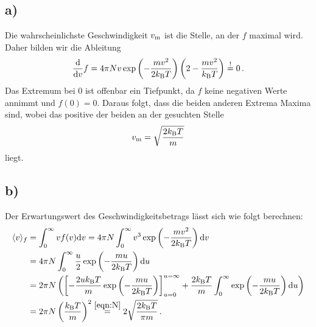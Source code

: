 \documentclass[a4paper, 11pt]{article}
\DeclarePairedDelimiter{\ev}{\langle}{\rangle}
\begin{document}
\subsection*{a)}
Die wahrscheinlichste Geschwindigkeit $v_\textup{m}$ ist die Stelle, an der $f$ maximal wird. Daher bilden wir die Ableitung
\begin{equation}
    \frac{\textup{d}}{\textup{d}v}f = 4\pi Nv\exp\left(-\frac{m v^2}{2 k_\textup{B}T}\right)\left(2 - \frac{mv^2}{k_\textup{B}T}\right) \stackrel{\textup{!}}{=} 0 \,.
\end{equation}
Das Extremum bei 0 ist offenbar ein Tiefpunkt, da $f$ keine negativen Werte annimmt und $f(0) = 0$. Daraus folgt, dass die beiden anderen Extrema Maxima sind, wobei das positive der beiden an der gesuchten Stelle
\begin{equation}
    v_\textup{m} = \sqrt{\frac{2 k_\textup{B} T}{m}}
    \label{eqn:v_m}
\end{equation}
liegt.
\subsection*{b)}
Der Erwartungswert des Geschwindigkeitsbetrags lässt sich wie folgt berechnen:
\begin{align}
    \ev{v}_f &= \int_{0}^{\infty} v f(v) \textup{d}v = 4\pi N \int_{0}^{\infty} v^3 \exp\left(-\frac{mv^2}{2k_\textup{B}T}\right) \textup{d}v \\
    &= 4\pi N \int_{0}^{\infty} \frac{u}{2} \exp\left(-\frac{mu}{2k_\textup{B}T}\right) \textup{d}u \\
    &= 2\pi N\left(\left[-\frac{2uk_\textup{B}T}{m}\exp\left(-\frac{mu}{2k_\textup{B}T}\right)\right]_{u=0}^{u=\infty} + \frac{2k_\textup{B}T}{m}\int_{0}^{\infty}\exp\left(-\frac{mu}{2k_\textup{B}T}\right) \textup{d}u\right) \\
    &= 2\pi N\left(\frac{k_\textup{B}T}{m}\right)^2 \stackrel{\eqref{eqn:N}}{=} 2 \sqrt{\frac{2k_\textup{B}T}{\pi m}} \,.
\end{align}
\end{document}
